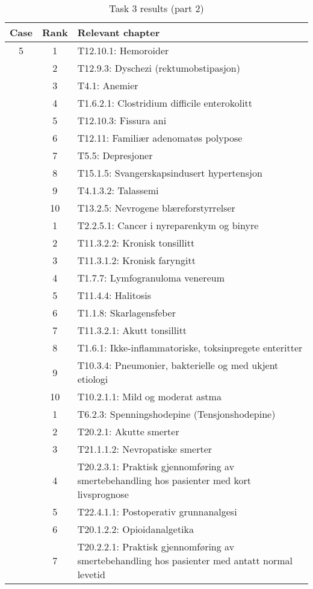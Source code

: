 \begin{table}[htbp] \footnotesize \center
\caption{Task 3 results (part 2)\label{tab:task3b}}
\begin{tabularx}{\textwidth}{c c X}
    \toprule
    Case & Rank & Relevant chapter \\
    \midrule
	5 & 1 & T12.10.1: Hemoroider \\
	 & 2 & T12.9.3: Dyschezi (rektumobstipasjon) \\
	 & 3 & T4.1: Anemier \\
	 & 4 & T1.6.2.1: Clostridium difficile enterokolitt \\
	 & 5 & T12.10.3: Fissura ani \\
	 & 6 & T12.11: Familiær adenomatøs polypose \\
	 & 7 & T5.5: Depresjoner \\
	 & 8 & T15.1.5: Svangerskapsindusert hypertensjon \\
	 & 9 & T4.1.3.2: Talassemi \\
	 & 10 & T13.2.5: Nevrogene blæreforstyrrelser \\
	\addlinespace
	6 & 1 & T2.2.5.1: Cancer i nyreparenkym og binyre \\
	 & 2 & T11.3.2.2: Kronisk tonsillitt \\
	 & 3 & T11.3.1.2: Kronisk faryngitt \\
	 & 4 & T1.7.7: Lymfogranuloma venereum \\
	 & 5 & T11.4.4: Halitosis \\
	 & 6 & T1.1.8: Skarlagensfeber \\
	 & 7 & T11.3.2.1: Akutt tonsillitt \\
	 & 8 & T1.6.1: Ikke-inflammatoriske, toksinpregete enteritter \\
	 & 9 & T10.3.4: Pneumonier, bakterielle og med ukjent etiologi \\
	 & 10 & T10.2.1.1: Mild og moderat astma \\
	\addlinespace
	7 & 1 & T6.2.3: Spenningshodepine (Tensjonshodepine) \\
	 & 2 & T20.2.1: Akutte smerter \\
	 & 3 & T21.1.1.2: Nevropatiske smerter \\
	 & 4 & T20.2.3.1: Praktisk gjennomføring av smertebehandling hos pasienter med kort livsprognose \\
	 & 5 & T22.4.1.1: Postoperativ grunnanalgesi \\
	 & 6 & T20.1.2.2: Opioidanalgetika \\
	 & 7 & T20.2.2.1: Praktisk gjennomføring av smertebehandling hos pasienter med antatt normal levetid \\

\end{tabularx}
\end{table}
